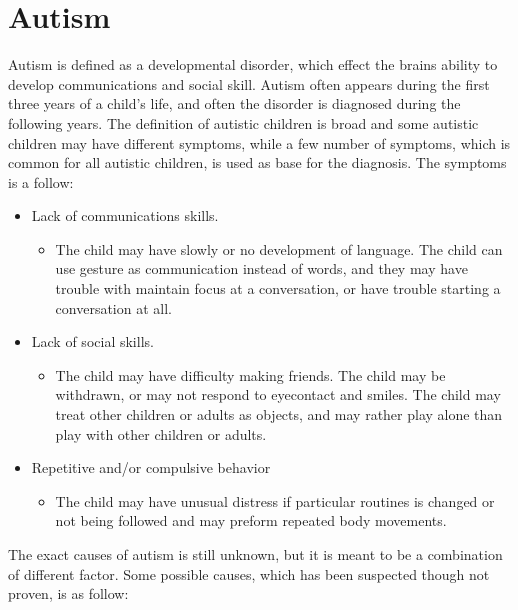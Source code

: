 \section{Autism}
Autism is defined as a developmental disorder, which effect the brains ability to develop communications and social skill. Autism often appears during the first three years of a child's life, and often the disorder is diagnosed during the following years.
The definition of autistic children is broad and some autistic children may have different symptoms, while a few number of symptoms, which is common for all autistic children, is used as base for the diagnosis. The symptoms is a follow:
\begin{itemize}

  \item{Lack of communications skills.}
   \begin{itemize}
     \item{The child may have slowly or no development of language. The child can use gesture as communication instead of words, and they may have trouble with maintain focus at a conversation, or have trouble starting a conversation at all.}
   \end{itemize}
   
  \item{Lack of social skills.}
   \begin{itemize}
     \item{The child may have difficulty making friends. The child may be withdrawn, or may not respond to eyecontact and smiles. The child may treat other children or adults as objects, and may rather play alone than play with other children or adults.}
   \end{itemize}

  \item{Repetitive and/or compulsive behavior}
    \begin{itemize}
      \item{The child may have unusual distress if particular routines is changed or not being followed and may preform repeated body movements.}
    \end{itemize}
  
\end{itemize}

The exact causes of autism is still unknown, but it is meant to be a combination of different factor.%
Some possible causes, which has been suspected though not proven, is as follow:

